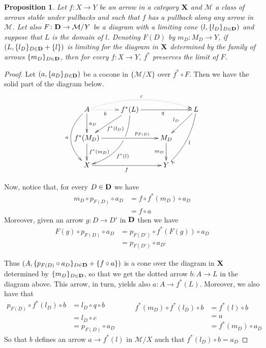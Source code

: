 \documentclass[a4paper]{article}
\def\D{\textbf {\textup{D}}}
\def\X{\textbf {\textup{X}}}
\newtheorem{proposition}[theorem]{Proposition}
\theoremstyle{definition}
\begin{document}
\begin{proposition} Let $f\colon X\to Y$ be an arrow in a category $\X$ and $\mathcal{M}$ a class of arrows stable under pullbacks and such that $f$ has a pullback along any arrow in $\mathcal{M}$. Let also $F\colon\D\to \mathcal{M}/Y$ be a diagram with a limiting cone $(l, \{l_D\}_{D\in \D})$ and suppose that  $L$ is the domain of $l$. Denoting $F(D)$ by  $m_D\colon M_D\to Y$, if  $(L, \{l_D\}_{D\in \D}+\{l\})$ is limiting for the diagram in $\X$ determined by the family of arrows $\{m_D\}_{D\in \D}$, then for every $f\colon X\to Y$, $f^*$ preserves the limit of $F$.
\end{proposition}
\begin{proof}
Let $(a, \{a_D\}_{D\in \D})$ be a cocone in $\{\mathcal{M}/X\}$ over $f^*\circ F$. Then we have the solid part of the diagram below.
\[\xymatrix{A \ar@/_.8cm/[dd]_{a}\ar[d]^{a_D}  \ar@{.>}[r]_-{b} \ar@/^.5cm/@{.>}[rrr]^{c}&f^*(L)  \ar@/^.7cm/[ddl]|(.37)\hole^(.6){f^*(l)} \ar[rr]_{q} \ar[dl]^{f^*(l_D)}&&L \ar@/^.3cm/[ddl]^{l} \ar[dl]_{l_D}\\f^*(M_D)  \ar[d]^{f^*(m_D)} \ar[rr]^(.7){p_{F(D)}}&& M_D \ar[d]_{m_D} \\ X \ar[rr]_{f}&& Y }\]

Now, notice that, for every $D\in \D$ we have
\begin{align*}
	m_D\circ p_{F(D)} \circ a_D&=f\circ f^*(m_D)\circ a_D \\&=f\circ a
\end{align*}
Moreover, given an arrow $g\colon D\to D'$ in $\D$ then we have
\begin{align*}
F(g)\circ p_{F(D)}\circ a_D&=p_{F(D')}\circ f^*(F(g))\circ a_D\\&=p_{F(D')}\circ a_{D'}
\end{align*}

Thus $(A, \{p_{F(D)}\circ a_D\}_{D\in \D}+ \{f\circ a\})$ is a cone over the diagram in $\X$ determined by $\{m_D\}_{D\in \D}$, so that we get the dotted arrow $b\colon A\to L$ in the diagram above. This arrow,  in turn, yields also $a\colon A\to f^*(L)$. Moreover, we also have that
\[
\begin{split}
	p_{F(D)}\circ f^*(l_D)\circ b&= l_D\circ q \circ b\\&=l_D\circ c\\&=p_{F(D)}\circ a_D
\end{split}\qquad 
\begin{split}
f^*(m_D) \circ f^*(l_D)\circ b&= f^*(l)\circ b\\&=a\\&=f^*(m_D)\circ a_D
\end{split}
\]
So that $b$ defines an arrow $a\to f^*(l)$ in $\mathcal{M}/X$ auch that $f^*(l_D)\circ b =a_D$


\end{proof}
\end{document}
